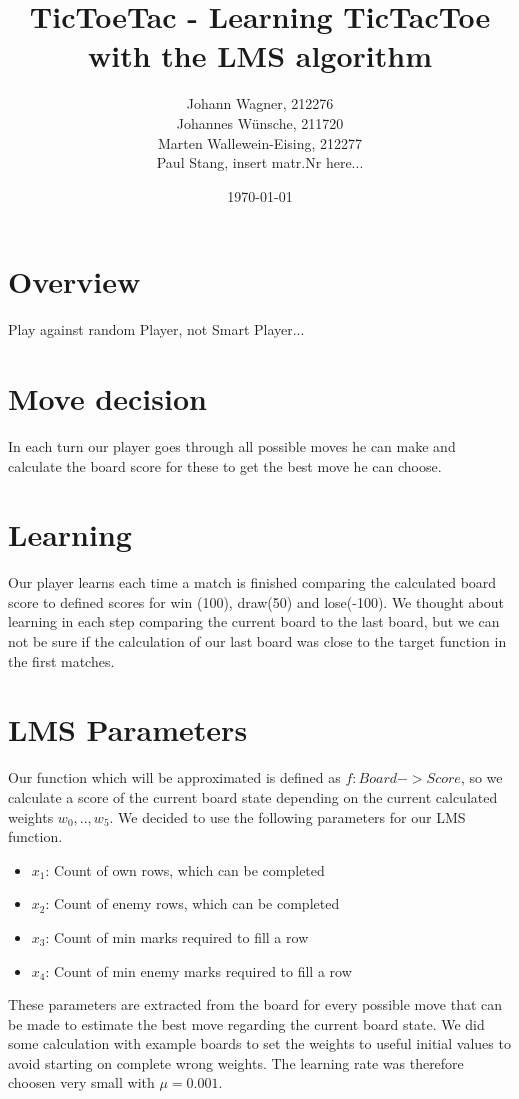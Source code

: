 \documentclass{article}
\begin{document}
\title{TicToeTac - Learning TicTacToe with the LMS algorithm}
\author{Johann Wagner, 212276 \\ Johannes Wünsche, 211720 \\ Marten Wallewein-Eising, 212277 \\ Paul Stang, insert matr.Nr here...}
\date{\today}
\maketitle

\section{Overview}
Play against random Player, not Smart Player...

\section{Move decision}
In each turn our player goes through all possible moves he can make and calculate the board score for these to get the best move he can choose. 

\section{Learning}
Our player learns each time a match is finished comparing the calculated board score to defined scores for win (100), draw(50) and lose(-100). We thought about learning in each step comparing the current board to the last board, but we can not be sure if the calculation of our last board was close to the target function in the first matches.

\section{LMS Parameters}
Our function which will be approximated is defined as $f: Board->Score$, so we calculate a score of the current board state depending on the current calculated weights $w_0,..,w_5$. We decided to use the following parameters for our LMS function.
\begin{itemize}
	\item $x_1$: Count of own rows, which can be completed
	\item $x_2$: Count of enemy rows, which can be completed
	\item $x_3$: Count of min marks required to fill a row
	\item $x_4$: Count of min enemy marks required to fill a row	
\end{itemize} 
These parameters are extracted from the board for every possible move that can be made to estimate the best move regarding the current board state. We did some calculation with example boards to set the weights to useful initial values to avoid starting on complete wrong weights. The learning rate was therefore choosen very small with $\mu = 0.001$.
\end{document}
